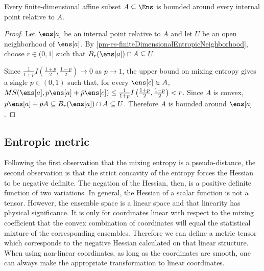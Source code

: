 \begin{mathSection}
\begin{prop}\label{pm-es-finiteDimensionalAffineBoundedness}
	Every finite-dimensional affine subset $A \subseteq \Ens$ is bounded around every internal point relative to $A$.
\end{prop}

\begin{proof}
	Let $\ens[a]$ be an internal point relative to $A$ and let $U$ be an open neighborhood of $\ens[a]$. By \ref{pm-es-finiteDimensionalEntropicNeighborhood}, choose $r \in (0,1]$ such that $B_r(\ens[a])\cap A \subseteq U$.
	
	Since $\frac{1}{1+p}I\left(\frac{1+p}{2},\frac{1-p}{2}\right)\to0$ as $p\to1$, the upper bound on mixing entropy gives a single $p \in (0,1)$ such that, for every $\ens[c] \in A$, $MS(\ens[a],p\ens[a]+\bar{p}\ens[c]) \leq \frac{1}{1+p}I\left(\frac{1+p}{2},\frac{1-p}{2}\right) < r$.
	Since $A$ is convex, $p\ens[a]+\bar{p}A \subseteq B_r(\ens[a])\cap A \subseteq U$. Therefore $A$ is bounded around $\ens[a]$.
	\end{proof}
\end{mathSection}

\subsection{Entropic metric}

Following the first observation that the mixing entropy is a pseudo-distance, the second observation is that the strict concavity of the entropy forces the Hessian to be negative definite. The negation of the Hessian, then, is a positive definite function of two variations. In general, the Hessian of a scalar function is not a tensor. However, the ensemble space is a linear space and that linearity has physical significance. It is only for coordinates linear with respect to the mixing coefficient that the convex combination of coordinates will equal the statistical mixture of the corresponding ensembles. Therefore we can define a metric tensor which corresponds to the negative Hessian calculated on that linear structure. When using non-linear coordinates, as long as the coordinates are smooth, one can always make the appropriate transformation to linear coordinates.

